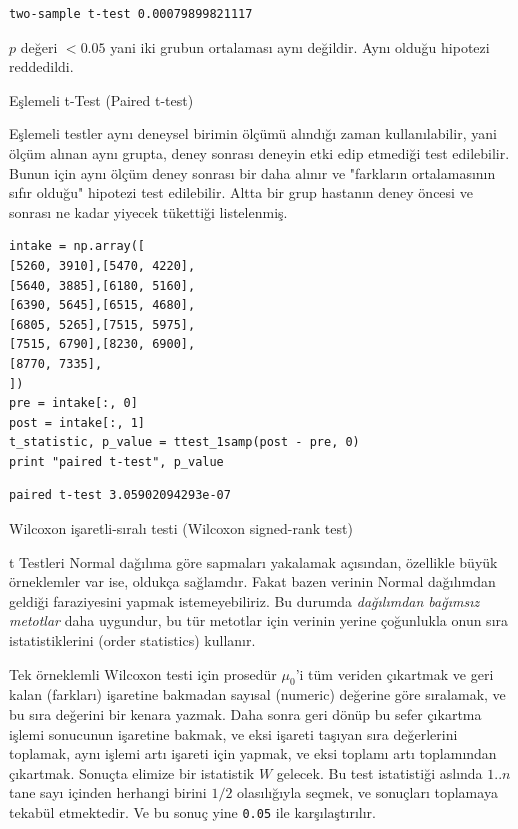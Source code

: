 \documentclass[12pt,fleqn]{article}\usepackage{../../common}
\begin{document}
\begin{verbatim}
two-sample t-test 0.00079899821117
\end{verbatim}

$p$ değeri $< 0.05$ yani iki grubun ortalaması aynı değildir. Aynı olduğu
hipotezi reddedildi.

Eşlemeli t-Test (Paired t-test)

Eşlemeli testler aynı deneysel birimin ölçümü alındığı zaman
kullanılabilir, yani ölçüm alınan aynı grupta, deney sonrası deneyin
etki edip etmediği test edilebilir. Bunun için aynı ölçüm deney
sonrası bir daha alınır ve "farkların ortalamasının sıfır olduğu"
hipotezi test edilebilir. Altta bir grup hastanın deney öncesi ve
sonrası ne kadar yiyecek tükettiği listelenmiş. 

\begin{verbatim}
intake = np.array([
[5260, 3910],[5470, 4220],
[5640, 3885],[6180, 5160],
[6390, 5645],[6515, 4680],
[6805, 5265],[7515, 5975],
[7515, 6790],[8230, 6900],
[8770, 7335],
])
pre = intake[:, 0]
post = intake[:, 1]
t_statistic, p_value = ttest_1samp(post - pre, 0)
print "paired t-test", p_value
\end{verbatim}

\begin{verbatim}
paired t-test 3.05902094293e-07
\end{verbatim}

Wilcoxon işaretli-sıralı testi (Wilcoxon signed-rank test)

t Testleri Normal dağılıma göre sapmaları yakalamak açısından,
özellikle büyük örneklemler var ise, oldukça sağlamdır. Fakat bazen
verinin Normal dağılımdan geldiği faraziyesini yapmak istemeyebiliriz.
Bu durumda {\em dağılımdan bağımsız metotlar} daha uygundur, bu tür
metotlar için verinin yerine çoğunlukla onun sıra istatistiklerini
(order statistics) kullanır.

Tek örneklemli Wilcoxon testi için prosedür $\mu_0$'i tüm veriden çıkartmak ve
geri kalan (farkları) işaretine bakmadan sayısal (numeric) değerine göre
sıralamak, ve bu sıra değerini bir kenara yazmak. Daha sonra geri dönüp bu sefer
çıkartma işlemi sonucunun işaretine bakmak, ve eksi işareti taşıyan sıra
değerlerini toplamak, aynı işlemi artı işareti için yapmak, ve eksi toplamı artı
toplamından çıkartmak. Sonuçta elimize bir istatistik $W$ gelecek. Bu test
istatistiği aslında $1..n$ tane sayı içinden herhangi birini $1/2$ olasılığıyla
seçmek, ve sonuçları toplamaya tekabül etmektedir. Ve bu sonuç yine \verb!0.05!
  ile karşılaştırılır.
\end{document}
